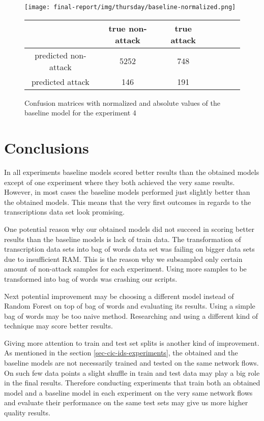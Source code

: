 \documentclass{article}
\begin{document}
\begin{figure}[h!]
    \centering
    \texttt{[image: final-report/img/thursday/baseline-normalized.png]}

    \centering
    \begin{tabular}{ |c|c|c|c|c|c|c| }
     \hline
      & true non-attack & true attack \\
     \hline
     predicted non-attack & 5252 & 748 \\
     \hline
     predicted attack & 146 & 191 \\
     \hline
    \end{tabular}
    \caption{Confusion matrices with normalized and absolute values of the baseline model for the experiment 4}
    \label{fig-exp4-baseline}
\end{figure}




\clearpage
\section{Conclusions}
In all experiments baseline models scored better results than the obtained models except of one experiment where they both achieved the very same results. However, in most cases the baseline models performed just slightly better than the obtained models. This means that the very first outcomes in regards to the transcriptions data set look promising.

One potential reason why our obtained models did not succeed in scoring better results than the baseline models is lack of train data. The transformation of transcription data sets into bag of words data set was failing on bigger data sets due to insufficient RAM. This is the reason why we subsampled only certain amount of non-attack samples for each experiment. Using more samples to be transformed into bag of words was crashing our scripts.

Next potential improvement may be choosing a different model instead of Random Forest on top of bag of words and evaluating its results. Using a simple bag of words may be too naive method. Researching and using a different kind of technique may score better results.

Giving more attention to train and test set splits is another kind of improvement. As mentioned in the section \ref{sec-cic-ids-experiments}, the obtained and the baseline models are not necessarily trained and tested on the same network flows. On such few data points a slight shuffle in train and test data may play a big role in the final results. Therefore conducting experiments that train both an obtained model and a baseline model in each experiment on the very same network flows and evaluate their performance on the same test sets may give us more higher quality results.
\end{document}
